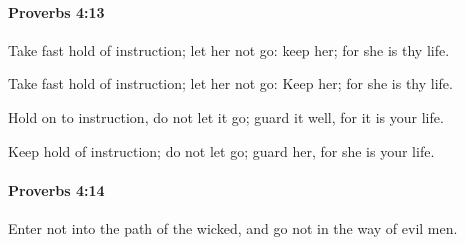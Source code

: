 		\paragraph{Proverbs 4:13} %
			\label{PROVERBS-4-13}

			Take fast hold of instruction; let her not go: keep her; for she is thy life.

			\begin{versebox}
					\item[BHS] 
					\item[ASV] Take fast hold of instruction; let her not go: Keep her; for she is thy life.
					\item[NIV] Hold on to instruction, do not let it go; guard it well, for it is your life.
					\item[NRSV] Keep hold of instruction; do not let go; guard her, for she is your life.
			\end{versebox}

		\paragraph{Proverbs 4:14} %
			\label{PROVERBS-4-14}

			Enter not into the path of the wicked, and go not in the way of evil men.

